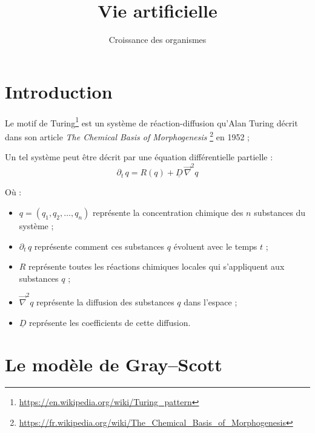\documentclass[11pt]{scrartcl}
\title{Vie artificielle}
\subtitle{Croissance des organismes}
\begin{document}
    \maketitle

    \section{Introduction}\label{sec:intro}

        Le motif de Turing\footnote{\url{https://en.wikipedia.org/wiki/Turing_pattern}} est un système de
        réaction-diffusion qu'Alan Turing décrit dans son article
        \emph{The Chemical Basis of Morphogenesis}
        \footnote{\url{https://fr.wikipedia.org/wiki/The\_Chemical\_Basis\_of\_Morphogenesis}} en 1952 ;


        Un tel système peut être décrit par une équation différentielle partielle :
        \[
            \partial_t \, q = R(q) + \underline{D} \, \overrightarrow{\nabla}^2 q
        \]

        Où :
        \begin{itemize}
            \setlength\itemsep{.5em}
            \item $q = (q_1, q_2, \dots, q_n)$ représente la concentration chimique des $n$ substances du système ;
            \item $\partial_t \, q$ représente comment ces substances $q$ évoluent avec le temps $t$ ;
            \item $R$ représente toutes les réactions chimiques locales qui s'appliquent aux substances $q$ ;
            \item $\overrightarrow{\nabla}^2 q$ représente la diffusion des substances $q$ dans l'espace ;
            \item $\underline{D}$ représente les coefficients de cette diffusion.
        \end{itemize}

    \section{Le modèle de Gray--Scott}\label{sec:gray-scott}
\end{document}
